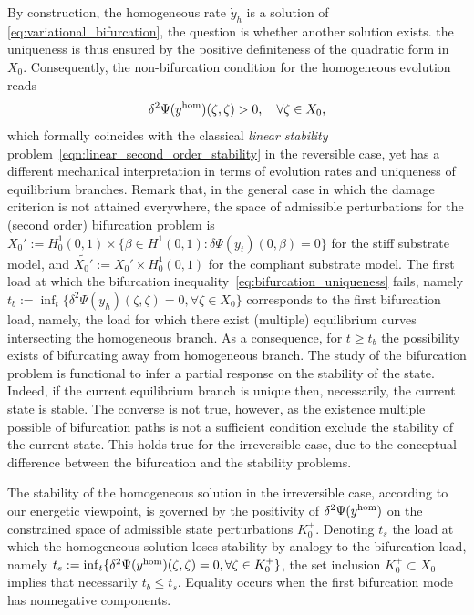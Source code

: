 By construction,
the homogeneous rate $\dot y_h$ is a solution of \eqref{eq:variational_bifurcation}, the question is whether another solution exists. 
the uniqueness is thus ensured by the positive definiteness of the quadratic form
in $X_0$.
Consequently, the non-bifurcation condition for the homogeneous evolution reads
\begin{equation}
    \label{eq:bifurcation_uniqueness}
    \delta^2 \Psi(y^{\text{hom}})(\zeta, \zeta) > 0, \quad \forall \zeta \in X_0,
\end{equation}
which formally coincides with the classical \emph{linear stability} problem~\eqref{eqn:linear_second_order_stability} in the reversible case, yet has a different mechanical interpretation in terms of evolution rates and uniqueness of equilibrium branches.
Remark that, in the general case in which the damage criterion is not attained everywhere, the space of admissible perturbations for the (second order) bifurcation problem is $X_0':=H^1_0(0, 1) \times \{ \beta \in H^1(0, 1) : \delta\Psi(y_t)(0, \beta) = 0 \}$ for the stiff substrate model, and $\widetilde{X_0'}:=X_0'\times H^1_0(0,1)$ for the compliant substrate model.
The first load at which the bifurcation inequality~\eqref{eq:bifurcation_uniqueness} fails, namely $t_b:=\inf_t \{\delta^2 \Psi(y_h)(\zeta, \zeta) =0, \forall \zeta \in X_0 \}$ corresponds to the first  bifurcation load, namely, the load for which there exist (multiple) equilibrium curves intersecting the homogeneous branch. As a consequence, for $t\geq t_b$  the possibility exists of bifurcating away from homogeneous branch. The study of the bifurcation problem is functional to infer a partial response on the stability of the state. Indeed, if the current equilibrium branch is unique then, necessarily, the current state is stable. The converse is not true, however, as the existence multiple possible of bifurcation paths is not a sufficient condition exclude the stability of the current state. This holds true for the irreversible case, due to the conceptual difference between the bifurcation and the stability problems.

The stability of the homogeneous solution in the irreversible case, according to our energetic viewpoint, is governed by the positivity of $\delta^2 \Psi(y^{\text{hom}})$ on the constrained space of admissible state perturbations $K^+_0$.
Denoting $t_s$ the load at which the homogeneous solution loses stability by analogy to the bifurcation load, namely $t_s: = \inf_t \{\delta^2 \Psi(y^{\text{hom}})(\zeta, \zeta) =0, \forall \zeta \in K^+_0 \}$, the set inclusion $K^+_0 \subset X_0$ implies that necessarily $t_b \leq t_s$. Equality occurs when the first bifurcation mode has nonnegative components.

